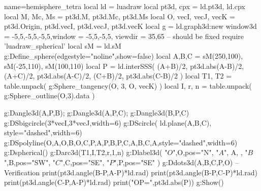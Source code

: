 \documentclass{standalone}
\begin{document}
\begin{luadraw}{name=hemisphere_tetra}
local ld = luadraw
local pt3d, cpx = ld.pt3d, ld.cpx
local M, Mc, Ms = pt3d.M, pt3d.Mc, pt3d.Ms
local O, vecI, vecJ, vecK = pt3d.Origin, pt3d.vecI, pt3d.vecJ, pt3d.vecK
local g = ld.graph3d:new{
    window3d = {-5,5,-5,5,-5,5},window = {-5,5,-5,5},
    viewdir = {35,65} -- should be fixed
}
require 'luadraw_spherical'
local sM = ld.sM
g:Define_sphere({edgestyle="noline",show=false})
local A,B,C = sM(250,100), sM(-25,110), sM(100,110)
local P = ld.interSSS( {(A+B)/2, pt3d.abs(A-B)/2}, {(A+C)/2, pt3d.abs(A-C)/2}, {(C+B)/2, pt3d.abs(C-B)/2} )
local T1, T2 = table.unpack( g:Sphere_tangency(O, 3, {O, vecK}) )
local I, r, n = table.unpack( g:Sphere_outline(O,3).data )

g:Dangle3d(A,P,B); g:Dangle3d(A,P,C); g:Dangle3d(B,P,C)
g:DSbigcircle({3*vecI,3*vecJ},{width=6})
g:DScircle( ld.plane(A,B,C), {style="dashed",width=6})
g:DSpolyline({{O,A},{O,B},{O,C},{P,A},{P,B},{P,C},{A,B},{C,A}},{style="dashed",width=6})
g:Dspherical()
g:Darc3d(T1,I,T2,r,1,n)
g:Dlabel3d(
    "$O$",O,{pos="N"}, "$A$", A, {},
    "$B$",B,{pos="SW"},
    "$C$",C,{pos="SE"},
    "$P$",P,{pos="SE"}
)
g:Ddots3d({A,B,C,P,O})
-- Verification
print(pt3d.angle(B-P,A-P)*ld.rad)
print(pt3d.angle(B-P,C-P)*ld.rad)
print(pt3d.angle(C-P,A-P)*ld.rad)
print("OP=",pt3d.abs(P))
g:Show()
\end{luadraw}
\end{document}
